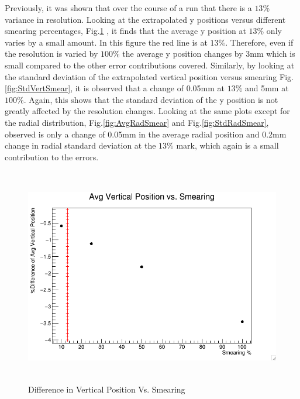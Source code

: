 \documentclass[./Thesis]{subfiles}
\begin{document}
Previously, it was shown that over the course of a run that there is a $13\%$ variance in resolution.  Looking at the extrapolated y positions versus different smearing percentages, Fig.\ref{fig:AvgVertSmear} , it finds that the average y position at $13\%$ only varies by a small amount. In this figure the red line is at $13\%$.  Therefore, even if the resolution is varied by $100\%$ the average y position changes by 3mm which is small compared to the other error contributions covered.  Similarly, by looking at the standard deviation of the extrapolated vertical position versus smearing Fig.\ref{fig:StdVertSmear}, it is observed that a change of 0.05mm at $13\%$ and 5mm at $100\%$. Again, this shows that the standard deviation of the y position is not greatly affected by the resolution changes.  Looking at the same plots except for the radial distribution, Fig.\ref{fig:AvgRadSmear} and Fig.\ref{fig:StdRadSmear}, observed is only a change of 0.05mm in the average radial position and 0.2mm change in radial standard deviation at the $13\%$  mark, which again is a small contribution to the errors.

\begin{figure}
	\centerline{\includegraphics[height=95mm]{AvgVerticalSmear.png}}
	\caption[AvgVerticalSmear]{Difference in Vertical Position Vs. Smearing}
	\label{fig:AvgVertSmear}
\end{figure} 	
\end{document}
